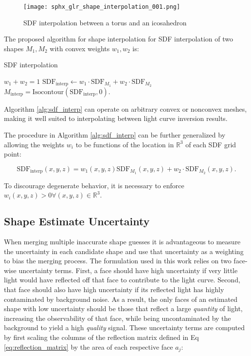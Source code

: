 \begin{figure}[!htb]
  \centering
  \texttt{[image: sphx\_glr\_shape\_interpolation\_001.png]}
  \caption{SDF interpolation between a torus and an icosahedron}
  \label{fig:interpolating_torus_ico}
\end{figure}

The proposed algorithm for shape interpolation for SDF interpolation of two shapes $M_1, M_2$ with convex weights $w_1, w_2$ is:

\begin{algorithm}
  \caption{SDF interpolation}\label{alg:sdf_interp}
  \begin{algorithmic}
  \Require $w_1 + w_2 = 1$
  \State $\mathrm{SDF}_{\textrm{interp}} \gets w_1 \cdot \mathrm{SDF}_{M_1} + w_2 \cdot \mathrm{SDF}_{M_2}$
  \State $M_{\textrm{interp}} = \mathrm{Isocontour}(\mathrm{SDF}_{\textrm{interp}}, 0)$.
  \end{algorithmic}
\end{algorithm}

Algorithm \ref{alg:sdf_interp} can operate on arbitrary convex or nonconvex meshes, making it well suited to interpolating between light curve inversion results.

The procedure in Algorithm \ref{alg:sdf_interp} can be further generalized by allowing the weights $w_i$ to be functions of the location in $\mathbb{R}^3$ of each SDF grid point:

\begin{equation}
  \mathrm{SDF}_{\textrm{interp}}(x, y, z) = w_1(x, y, z) \mathrm{SDF}_{M_1}(x, y, z) + w_2 \cdot \mathrm{SDF}_{M_2}(x, y, z).
\end{equation}

To discourage degenerate behavior, it is necessary to enforce $w_i(x,y,z) > 0 \forall (x,y,z) \in \mathbb{R}^3$.

\subsection{Shape Estimate Uncertainty}

When merging multiple inaccurate shape guesses it is advantageous to measure the uncertainty in each candidate shape and use that uncertainty as a weighting to bias the merging process. The formulation used in this work relies on two face-wise uncertainty terms. First, a face should have high uncertainty if very little light would have reflected off that face to contribute to the light curve. Second, that face should also have high uncertainty if its reflected light has highly contaminated by background noise. As a result, the only faces of an estimated shape with low uncertainty should be those that reflect a large \textit{quantity} of light, increasing the observability of that face, while being uncontaminated by the background to yield a high \textit{quality} signal. These uncertainty terms are computed by first scaling the columns of the reflection matrix defined in Eq \ref{eq:reflection_matrix} by the area of each respective face $a_j$:

